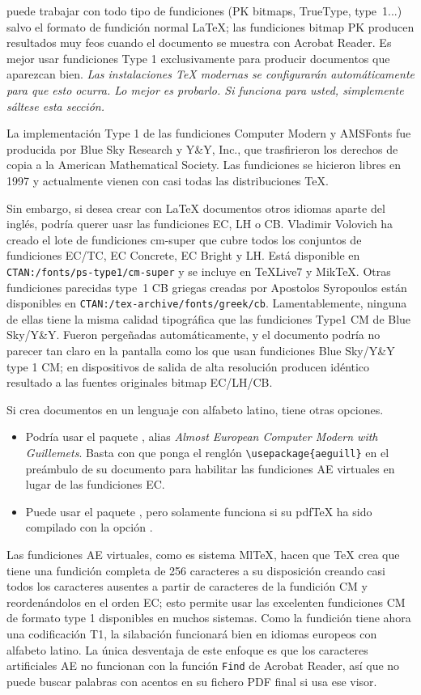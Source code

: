  puede trabajar con todo tipo de fundiciones (PK
bitmaps, TrueType, \PSi{} type~1...) salvo el formato de fundición
normal \LaTeX{}; las fundiciones bitmap PK producen resultados muy
feos cuando el documento se muestra con Acrobat Reader.  Es mejor usar
fundiciones \PSi{} Type 1 exclusivamente para producir documentos que
aparezcan bien.  \emph{Las instalaciones TeX modernas se configurarán
automáticamente para que esto ocurra.  Lo mejor es probarlo.  Si
funciona para usted, simplemente sáltese esta sección.}

La implementación \PSi{} Type 1 de las fundiciones Computer Modern y
AMSFonts fue producida por Blue Sky Research y Y\&Y, Inc., que
trasfirieron los derechos de copia a la American Mathematical Society.
Las fundiciones se hicieron libres en 1997 y actualmente vienen con
casi todas las distribuciones \TeX{}.

Sin embargo, si desea crear con \LaTeX{} documentos otros idiomas
aparte del inglés, podría querer uasr las fundiciones  EC, LH o CB.  
Vladimir Volovich ha creado el lote de fundiciones cm-super que cubre
todos los conjuntos de fundiciones EC/TC, EC Concrete, EC Bright y LH.
Está disponible en
\texttt{CTAN:/fonts/ps-type1/cm-super} y se incluye en \TeX{}Live7
y Mik\TeX.  Otras fundiciones parecidas type~1 CB griegas creadas por Apostolos
Syropoulos están disponibles en
\texttt{CTAN:/tex-archive/fonts/greek/cb}.  Lamentablemente, ninguna
de ellas tiene la misma calidad tipográfica que las fundiciones Type1
CM de Blue Sky/Y\&Y.  Fueron pergeñadas automáticamente, y el
documento podría no parecer tan claro en la pantalla como los que usan
fundiciones
Blue Sky/Y\&Y type 1 CM; en dispositivos de salida de alta resolución
producen idéntico resultado a las fuentes originales bitmap EC/LH/CB. 

Si crea documentos en un lenguaje con alfabeto latino, tiene otras opciones.
\begin{itemize}
\item Podría usar el paquete , alias
  \emph{Almost European Computer Modern with Guillemets}.  Basta con
  que ponga el renglón
  \newline \verb+\usepackage{aeguill}+  en el preámbulo
  de su documento para habilitar las fundiciones AE virtuales en lugar
  de las fundiciones EC.
\item Puede usar el paquete , pero solamente funciona si su
  pdf\TeX{} ha sido compilado con la opción .
\end{itemize}
Las fundiciones AE virtuales, como es sistema {Ml\TeX}, hacen que
\TeX{} crea que tiene una fundición completa de 256 caracteres a su
disposición creando casi todos los caracteres ausentes a partir de
caracteres de la fundición CM y reordenándolos en el orden EC; esto
permite usar las excelenten fundiciones CM de formato type 1
disponibles en muchos sistemas.  Como la fundición tiene ahora una
codificación T1, la silabación funcionará bien en idiomas europeos con
alfabeto latino.  La única desventaja de este enfoque es que los
caracteres artificiales AE no funcionan con la función \texttt{Find}
de Acrobat Reader, así que no puede buscar palabras con acentos en su
fichero PDF final si usa ese visor.


